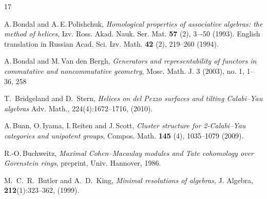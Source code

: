 \documentclass[a4paper,11pt, reqno]{amsart}
\theoremstyle{plain}
\theoremstyle{definition}
\numberwithin{equation}{section}
\begin{document}
\begin{thebibliography}{17}

A.\,Bondal and A.\,E.\,Polishchuk, 
{\it Homological properties of associative algebras: the method of helices}, 
Izv. Ross. Akad. Nauk. Ser. Mat. \textbf{57} (2), 3–-50 (1993). English translation in Russian Acad. Sci. Izv. Math. \textbf{42} (2), 219--260 (1994).

A.\,Bondal and M.\,Van den Bergh, 
{\it Generators and representability of
functors in commutative and noncommutative geometry}, 
Mosc. Math. J.
3 (2003), no. 1, 1–36, 258

T.~Bridgeland and D.~Stern, \emph{Helices on del Pezzo surfaces and tilting Calabi--Yau algebras}
Adv. Math., 224(4):1672--1716, (2010).



A.\,Buan, O.\,Iyama, I.\,Reiten and J.\,Scott, 
{\it Cluster structure for 2-Calabi--Yau categories and unipotent groups}, 
Compos. Math. \textbf{145} (4), 1035--1079 (2009).

R.-O.\,Buchweitz, 
{\it Maximal Cohen–Macaulay modules and Tate cohomology over Gorenstein rings}, 
preprint, Univ. Hannover, 1986.


 M.~C.~R.~Butler and A.~D.~King, {\it Minimal resolutions of algebras}, J. Algebra,
\textbf{212}(1):323--362, (1999).


\end{thebibliography}
\end{document}
